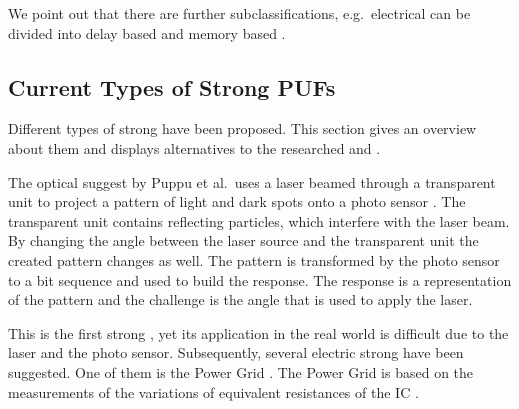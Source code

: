 We point out that there are further subclassifications, e.g.\ electrical \pufs can be divided into delay based \pufs and memory based \pufs \cite{Saha2016TV-PUFPUF}.


\subsection{Current Types of Strong PUFs}
\label{sec:typesofpufs}

Different types of strong \pufs have been proposed.
This section gives an overview about them and displays alternatives to the researched \apuf and \xpuf. 

The optical \puf suggest by Puppu et al.\ uses a laser beamed through a transparent unit to project a pattern of light and dark spots onto a photo sensor \cite{Pappu2001PhysicalFunctions}.
The transparent unit contains reflecting particles, which interfere with the laser beam.
By changing the angle between the laser source and the transparent unit the created pattern changes as well.
The pattern is transformed by the photo sensor to a bit sequence and used to build the response.
The \puf response is a representation of the pattern and the challenge is the angle that is used to apply the laser.

This is the first strong \puf, yet its application in the real world is difficult due to the laser and the photo sensor.
Subsequently, several electric strong \puf have been suggested. %
One of them is the Power Grid \puf.
The Power Grid \puf is based on the measurements of the variations of equivalent resistances of the \ac{IC} \cite{Helinski2009AVariations}.

